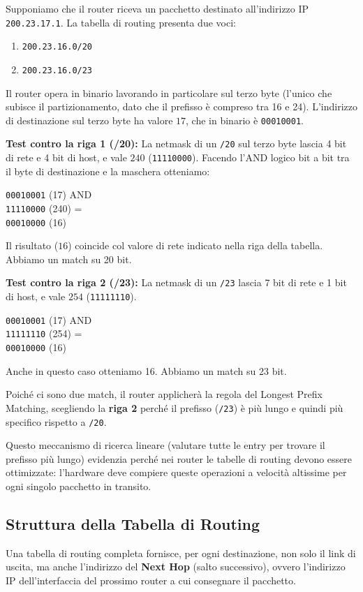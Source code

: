 \begin{example}
Supponiamo che il router riceva un pacchetto destinato all'indirizzo IP \texttt{200.23.17.1}. 
La tabella di routing presenta due voci:
\begin{enumerate}
    \item \texttt{200.23.16.0/20}
    \item \texttt{200.23.16.0/23}
\end{enumerate}
Il router opera in binario lavorando in particolare sul terzo byte (l'unico che subisce il partizionamento, dato che il prefisso è compreso tra 16 e 24).
L'indirizzo di destinazione sul terzo byte ha valore $17$, che in binario è \texttt{00010001}.

\textbf{Test contro la riga 1 (/20):}
La netmask di un \texttt{/20} sul terzo byte lascia 4 bit di rete e 4 bit di host, e vale $240$ (\texttt{11110000}).
Facendo l'AND logico bit a bit tra il byte di destinazione e la maschera otteniamo:
\begin{center}
\texttt{00010001} (17) AND \\
\texttt{11110000} (240) = \\
\texttt{00010000} (16)
\end{center}
Il risultato ($16$) coincide col valore di rete indicato nella riga della tabella. Abbiamo un match su 20 bit.

\textbf{Test contro la riga 2 (/23):}
La netmask di un \texttt{/23} lascia 7 bit di rete e 1 bit di host, e vale $254$ (\texttt{11111110}).
\begin{center}
\texttt{00010001} (17) AND \\
\texttt{11111110} (254) = \\
\texttt{00010000} (16)
\end{center}
Anche in questo caso otteniamo 16. Abbiamo un match su 23 bit.

Poiché ci sono due match, il router applicherà la regola del Longest Prefix Matching, scegliendo la \textbf{riga 2} perché il prefisso (\texttt{/23}) è più lungo e quindi più specifico rispetto a \texttt{/20}.
\end{example}

Questo meccanismo di ricerca lineare (valutare tutte le entry per trovare il prefisso più lungo) evidenzia perché nei router le tabelle di routing devono essere ottimizzate: l'hardware deve compiere queste operazioni a velocità altissime per ogni singolo pacchetto in transito.

\subsection{Struttura della Tabella di Routing}
Una tabella di routing completa fornisce, per ogni destinazione, non solo il link di uscita, ma anche l'indirizzo del \textbf{Next Hop} (salto successivo), ovvero l'indirizzo IP dell'interfaccia del prossimo router a cui consegnare il pacchetto.

